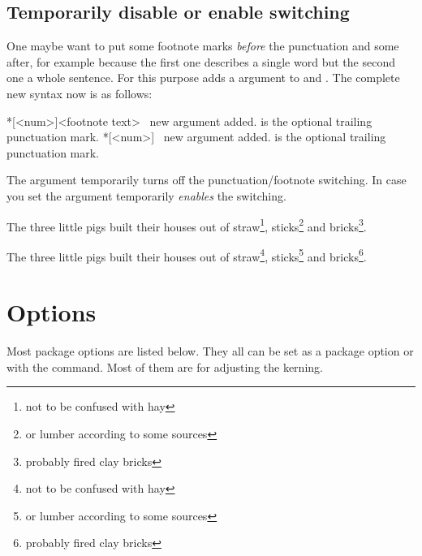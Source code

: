 \documentclass[toc=index,toc=bib]{cnpkgdoc}
\begin{document}
\subsection{Temporarily disable or enable switching}
One maybe want to put some footnote marks \emph{before} the punctuation and some
after, for example because the first one describes a single word but the second
one a whole sentence. For this purpose \fnpct adds a \code{*} argument to 
and . The complete new syntax now is as follows:
\begin{beschreibung}
 *[<num>]{<footnote text>} \cnpkgdocarrow\ new
 \code{*} argument added.  is the optional trailing punctuation
 mark.
 *[<num>] \cnpkgdocarrow\ new \code{*} argument
 added.  is the optional trailing punctuation mark.
\end{beschreibung}
The \code{*} argument temporarily turns off the punctuation/footnote switching.
In case you set  the \code{*} argument temporarily
\emph{enables} the switching.
\begin{beispiel}
 \begin{minipage}{.4\linewidth}
  \noindent The three little pigs built their houses
  out of straw\footnote*{not to be confused with hay},
  sticks\footnote{or lumber according to some sources}
  and bricks\footnote{probably fired clay bricks}.
 \end{minipage}\hfil
 \begin{minipage}{.4\linewidth}
  \noindent The three little pigs built their houses
  out of straw\footnote*{not to be confused with hay},
  sticks\footnote{or lumber according to some sources}
  and bricks\footnote{probably fired clay bricks}.
 \end{minipage}
\end{beispiel}

\section{Options}\label{sec:options}
Most package options are listed below. They all can be set as a package option or
with the  command. Most of them are for adjusting the kerning.
\end{document}
